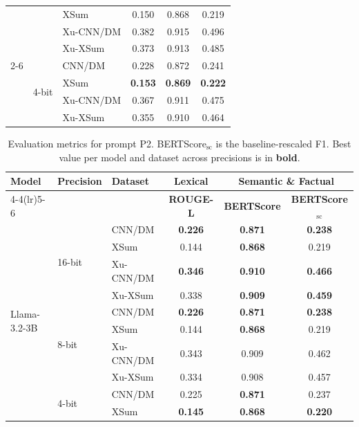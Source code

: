 \begin{table}[tbp]
\begin{tabular}{lllccc}
 &  & XSum & 0.150 & 0.868 & 0.219 \\
 &  & Xu-CNN/DM & 0.382 & 0.915 & 0.496 \\
 &  & Xu-XSum & 0.373 & 0.913 & 0.485 \\
\cmidrule(lr){2-6}
 & \multirow{4}{*}{4-bit} & CNN/DM & 0.228 & 0.872 & 0.241 \\
 &  & XSum & \textbf{0.153} & \textbf{0.869} & \textbf{0.222} \\
 &  & Xu-CNN/DM & 0.367 & 0.911 & 0.475 \\
 &  & Xu-XSum & 0.355 & 0.910 & 0.464 \\
\bottomrule
\end{tabular}
\end{table}

\begin{table}[tbp]
\centering
\footnotesize
\setlength{\tabcolsep}{4pt}
\caption{Evaluation metrics for prompt P2. BERTScore$_{\mathrm{sc}}$ is the baseline-rescaled F1. Best value per model and dataset across precisions is in \textbf{bold}.}
\label{tab:eval-P2}
\begin{tabular}{lllccc}
\toprule
\multirow{2}{*}{\textbf{Model}} & \multirow{2}{*}{\textbf{Precision}} & \multirow{2}{*}{\textbf{Dataset}} & \textbf{Lexical} & \multicolumn{2}{c}{\textbf{Semantic \& Factual}} \\
\cmidrule(lr){4-4}\cmidrule(lr){5-6}
 & & & \textbf{ROUGE-L} & \textbf{BERTScore} & \textbf{BERTScore$_{\mathrm{sc}}$} \\
\midrule
\multirow{12}{*}{Llama-3.2-3B} & \multirow{4}{*}{16-bit} & CNN/DM & \textbf{0.226} & \textbf{0.871} & \textbf{0.238} \\
 &  & XSum & 0.144 & \textbf{0.868} & 0.219 \\
 &  & Xu-CNN/DM & \textbf{0.346} & \textbf{0.910} & \textbf{0.466} \\
 &  & Xu-XSum & 0.338 & \textbf{0.909} & \textbf{0.459} \\
\cmidrule(lr){2-6}
 & \multirow{4}{*}{8-bit} & CNN/DM & \textbf{0.226} & \textbf{0.871} & \textbf{0.238} \\
 &  & XSum & 0.144 & \textbf{0.868} & 0.219 \\
 &  & Xu-CNN/DM & 0.343 & 0.909 & 0.462 \\
 &  & Xu-XSum & 0.334 & 0.908 & 0.457 \\
\cmidrule(lr){2-6}
 & \multirow{4}{*}{4-bit} & CNN/DM & 0.225 & \textbf{0.871} & 0.237 \\
 &  & XSum & \textbf{0.145} & \textbf{0.868} & \textbf{0.220} \\

\end{tabular}
\end{table}
